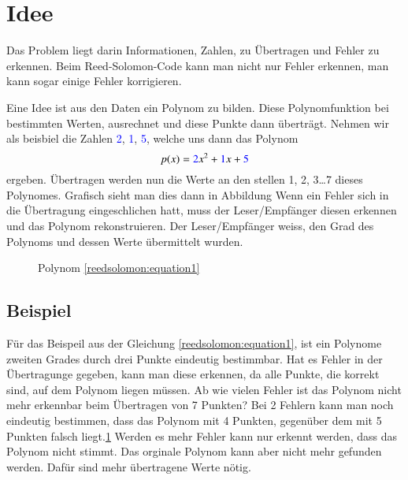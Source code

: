 %
%
%
\section{Idee
\label{reedsolomon:section:idee}}
Das Problem liegt darin Informationen, Zahlen, 
zu Übertragen und Fehler zu erkennen.
Beim Reed-Solomon-Code kann man nicht nur Fehler erkennen, 
man kann sogar einige Fehler korrigieren.

Eine Idee ist aus den Daten 
ein Polynom zu bilden.
Diese Polynomfunktion bei bestimmten Werten, ausrechnet und diese Punkte dann überträgt.
Nehmen wir als beisbiel die Zahlen \textcolor{blue}{2}, \textcolor{blue}{1}, \textcolor{blue}{5},
welche uns dann das Polynom 
\begin{equation}
p(x)
=
\textcolor{blue}{2}x^2 + \textcolor{blue}{1}x + \textcolor{blue}{5}
\label{reedsolomon:equation1}
\end{equation}
ergeben.
Übertragen werden nun die Werte an den stellen 1, 2, 3\dots 7 dieses Polynomes.
Grafisch sieht man dies dann in Abbildung 
Wenn ein Fehler sich in die Übertragung eingeschlichen hatt, muss der Leser/Empfänger diesen erkennen und das Polynom rekonstruieren.
Der Leser/Empfänger weiss, den Grad des Polynoms und dessen Werte übermittelt wurden. 

\begin{figure}
	\centering
	\caption{Polynom \eqref{reedsolomon:equation1}}
	\label{fig:polynom}
\end{figure}

\subsection{Beispiel}
Für das Beispeil aus der Gleichung \eqref{reedsolomon:equation1},
ist ein Polynome zweiten Grades durch drei Punkte eindeutig bestimmbar.
Hat es Fehler in der Übertragunge gegeben, kann man diese erkennen,
da alle Punkte, die korrekt sind, auf dem Polynom liegen müssen.
Ab wie vielen Fehler ist das Polynom nicht mehr erkennbar beim Übertragen von 7 Punkten?
Bei 2 Fehlern kann man noch eindeutig bestimmen, dass das Polynom mit 4 Punkten,
gegenüber dem mit 5 Punkten falsch liegt.\ref{fig:polynom}
Werden es mehr Fehler kann nur erkennt werden, dass das Polynom nicht stimmt.
Das orginale Polynom kann aber nicht mehr gefunden werden.
Dafür sind mehr übertragene Werte nötig.

